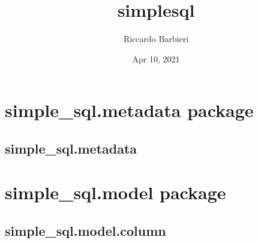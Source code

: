 \documentclass[letterpaper,10pt,english]{sphinxmanual}
\title{simple\sphinxhyphen{}sql}
\date{Apr 10, 2021}
\author{Riccardo Barbieri}
\begin{document}
\pagestyle{empty}
\sphinxmaketitle
\pagestyle{plain}
\sphinxtableofcontents
\pagestyle{normal}
\label{\detokenize{index::doc}}



\chapter{simple\_sql.metadata package}
\label{\detokenize{metadata:simple-sql-metadata-package}}\label{\detokenize{metadata::doc}}

\section{simple\_sql.metadata}
\label{\detokenize{metadata:simple-sql-metadata}}

\begin{fulllineitems}
\label{\detokenize{metadata:mini_sql.metadata.MetaData}}
\end{fulllineitems}



\chapter{simple\_sql.model package}
\label{\detokenize{model:simple-sql-model-package}}\label{\detokenize{model::doc}}

\section{simple\_sql.model.column}
\label{\detokenize{model:simple-sql-model-column}}
\end{document}
